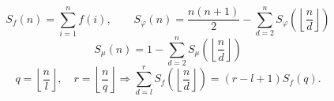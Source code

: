 \[
S_f(n)=\sum_{i=1}^n f(i),\qquad
S_{\varphi}(n)=\frac {n(n+1)}2-\sum_{d=2}^n
S_{\varphi}\left(\left\lfloor\frac nd\right\rfloor\right)
\]
\[
S_\mu(n)=1-\sum_{d=2}^n
S_\mu\left(\left\lfloor\frac nd\right\rfloor\right)
\]
\[
q=\left\lfloor\frac nl\right\rfloor,\quad
r=\left\lfloor\frac nq\right\rfloor
\Rightarrow
\sum_{d=l}^{r}S_f\left(\left\lfloor\frac nd\right\rfloor\right)
=(r-l+1)S_f(q).
\]
